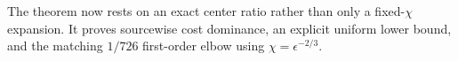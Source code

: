 The theorem now rests on an exact center ratio rather than only a fixed-\(\chi\) expansion. It proves sourcewise cost dominance, an explicit uniform lower bound, and the matching \(1/726\) first-order elbow using \(\chi=\epsilon^{-2/3}\).